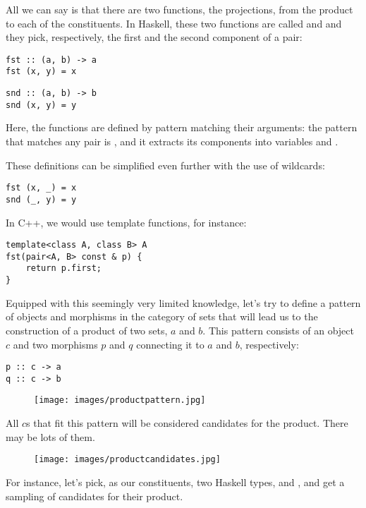 All we can say is that there are two functions, the projections, from
the product to each of the constituents. In Haskell, these two functions
are called  and  and they pick, respectively,
the first and the second component of a pair:

\begin{Verbatim}
fst :: (a, b) -> a
fst (x, y) = x
\end{Verbatim}

\begin{Verbatim}
snd :: (a, b) -> b
snd (x, y) = y
\end{Verbatim}
Here, the functions are defined by pattern matching their arguments: the
pattern that matches any pair is , and it extracts its
components into variables  and .

These definitions can be simplified even further with the use of
wildcards:

\begin{Verbatim}
fst (x, _) = x
snd (_, y) = y
\end{Verbatim}
In C++, we would use template functions, for instance:

\begin{Verbatim}
template<class A, class B> A
fst(pair<A, B> const & p) {
    return p.first;
}
\end{Verbatim}
Equipped with this seemingly very limited knowledge, let's try to define
a pattern of objects and morphisms in the category of sets that will
lead us to the construction of a product of two sets, $a$ and
$b$. This pattern consists of an object $c$ and two morphisms
$p$ and $q$ connecting it to $a$ and $b$,
respectively:

\begin{Verbatim}
p :: c -> a
q :: c -> b
\end{Verbatim}

\begin{figure}[H]
\centering
\texttt{[image: images/productpattern.jpg]}
\end{figure}

\noindent
All $c$s that fit this pattern will be considered candidates for
the product. There may be lots of them.

\begin{figure}[H]
\centering
\texttt{[image: images/productcandidates.jpg]}
\end{figure}

\noindent
For instance, let's pick, as our constituents, two Haskell types,
 and , and get a sampling of candidates for
their product.

